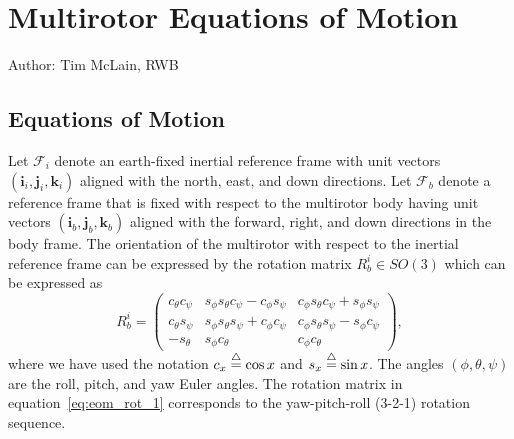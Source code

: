 \chapter{Multirotor Equations of Motion}
\label{chap:multirotor}

Author: Tim McLain, RWB

\section{Equations of Motion}
Let $\mathcal{F}_i$ denote an earth-fixed inertial reference frame with unit vectors $(\mathbf{i}_i,\mathbf{j}_i,\mathbf{k}_i)$ aligned with the north, east, and down directions. Let $\mathcal{F}_b$ denote a reference frame that is fixed with respect to the multirotor body having unit vectors $(\mathbf{i}_b,\mathbf{j}_b,\mathbf{k}_b)$ aligned with the forward, right, and down directions in the body frame. The orientation of the multirotor with respect to the inertial reference frame can be expressed by the rotation matrix $R_b^i \in \mathit{SO}(3)$ which can be expressed as\cite{BeardMcLain12}
\begin{equation}
R_b^i = 
\begin{pmatrix} c_{\theta} c_{\psi} & s_{\phi} s_{\theta} c_{\psi} - c_{\phi} s_{\psi}
& c_{\phi} s_{\theta} c_{\psi} + s_{\phi} s_{\psi} \\
c_{\theta} s_{\psi} &  s_{\phi} s_{\theta} s_{\psi} + c_{\phi} c_{\psi}
  & c_{\phi} s_{\theta} s_{\psi} - s_{\phi} c_{\psi}  \\
-s_{\theta} & s_{\phi} c_{\theta} & c_{\phi} c_{\theta}
\end{pmatrix},
\label{eq:eom_rot_1}
\end{equation}
where we have used the notation $c_x\stackrel{\triangle}{=}\cos x$ and $s_x\stackrel{\triangle}{=} \sin x$. The angles $(\phi,\theta,\psi)$ are the roll, pitch, and yaw Euler angles. The rotation matrix in equation~\eqref{eq:eom_rot_1} corresponds to the yaw-pitch-roll (3-2-1) rotation sequence.

